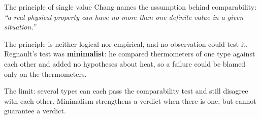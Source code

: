 \documentclass[aspectratio=169,11pt]{beamer}
\begin{document}
\begin{frame}[label=single]{The principle of single value}
Chang names the assumption behind comparability: \emph{``a real physical property can have no more than one definite value in a given situation.''}

\vspace{0.1em}
{\small The principle is neither logical nor empirical, and no observation could test it. Regnault's test was \textbf{minimalist}: he compared thermometers of one type against each other and added no hypotheses about heat, so a failure could be blamed only on the thermometers.}

\vspace{0.1em}
\begin{center}
\end{center}

{\small The limit: several types can each pass the comparability test and still disagree with each other. Minimalism strengthens a verdict when there is one, but cannot guarantee a verdict.}
\end{frame}
\end{document}

